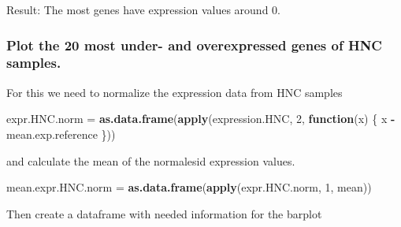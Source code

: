 \documentclass[]{article}
\newenvironment{Shaded}{\begin{snugshade}}{\end{snugshade}}
\newcommand{\KeywordTok}[1]{\textcolor[rgb]{0.13,0.29,0.53}{\textbf{#1}}}
\newcommand{\DataTypeTok}[1]{\textcolor[rgb]{0.13,0.29,0.53}{#1}}
\newcommand{\DecValTok}[1]{\textcolor[rgb]{0.00,0.00,0.81}{#1}}
\newcommand{\StringTok}[1]{\textcolor[rgb]{0.31,0.60,0.02}{#1}}
\newcommand{\ControlFlowTok}[1]{\textcolor[rgb]{0.13,0.29,0.53}{\textbf{#1}}}
\newcommand{\OperatorTok}[1]{\textcolor[rgb]{0.81,0.36,0.00}{\textbf{#1}}}
\newcommand{\NormalTok}[1]{#1}
\begin{document}
Result: The most genes have expression values around 0.

\subsubsection{Plot the 20 most under- and overexpressed genes of HNC
samples.}\label{plot-the-20-most-under--and-overexpressed-genes-of-hnc-samples.}

For this we need to normalize the expression data from HNC samples

\begin{Shaded}
\begin{Highlighting}[]
\NormalTok{expr.HNC.norm =}\StringTok{ }\KeywordTok{as.data.frame}\NormalTok{(}\KeywordTok{apply}\NormalTok{(expression.HNC, }\DecValTok{2}\NormalTok{, }\ControlFlowTok{function}\NormalTok{(x) \{}
\NormalTok{  x }\OperatorTok{-}\StringTok{ }\NormalTok{mean.exp.reference}
\NormalTok{\}))}
\end{Highlighting}
\end{Shaded}

and calculate the mean of the normalesid expression values.

\begin{Shaded}
\begin{Highlighting}[]
\NormalTok{mean.expr.HNC.norm =}\StringTok{ }\KeywordTok{as.data.frame}\NormalTok{(}\KeywordTok{apply}\NormalTok{(expr.HNC.norm, }\DecValTok{1}\NormalTok{, mean))}
\end{Highlighting}
\end{Shaded}

Then create a dataframe with needed information for the barplot

\begin{Shaded}
\end{Shaded}
\end{document}

